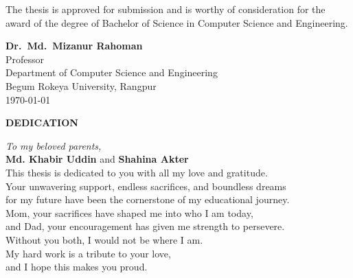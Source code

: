\vspace{1cm}

The thesis is approved for submission and is worthy of consideration for the award of the degree of Bachelor of Science in Computer Science and Engineering.

\vspace{3cm}

\begin{flushright}
    \textbf{Dr.\ Md.\ Mizanur Rahoman}\\
    Professor\\
    Department of Computer Science and Engineering\\
    Begum Rokeya University, Rangpur\\
    \today
\end{flushright}

\newpage
\thispagestyle{empty}
\vspace*{4cm}

\begin{center}
    {\Large\bfseries DEDICATION}
\end{center}

\vspace{2cm}

\begin{center}
    \textit{To my beloved parents,}\\[0.5cm]
    \textbf{Md. Khabir Uddin} and \textbf{Shahina Akter}\\[1cm]
    
    This thesis is dedicated to you with all my love and gratitude.\\[0.5cm]
    
    Your unwavering support, endless sacrifices, and boundless dreams\\
    for my future have been the cornerstone of my educational journey.\\[0.8cm]
    
    Mom, your sacrifices have shaped me into who I am today,\\
    and Dad, your encouragement has given me strength to persevere.\\[0.8cm]
    
    Without you both, I would not be where I am.\\[0.5cm]
    
    My hard work is a tribute to your love,\\
    and I hope this makes you proud.
\end{center}    

\newpage